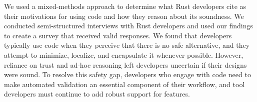We used a mixed-methods approach to determine what Rust developers cite as their motivations for using \unsafe code and how they reason about its soundness.  We conducted semi-structured interviews with  Rust developers and used our findings to create a survey that received  valid responses. We found that developers typically use \unsafe code when they perceive that there is no safe alternative, and they attempt to minimize, localize, and encapsulate it whenever possible. However, reliance on trust and ad-hoc reasoning left developers uncertain if their designs were sound. To resolve this safety gap, developers who engage with \unsafe code need to make automated validation an essential component of their workflow, and tool developers must continue to add robust support for \unsafe features.